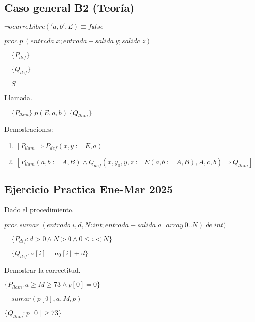 \documentclass[hidelinks]{article}
\begin{document}
\subsection{Caso general B2 (Teoría)}

$\neg ocurreLibre('a,b', E) \equiv false$ \par
$proc \; p \; (entrada \; x; entrada-salida \; y; salida \; z) $ \par
$\quad \{P_{def}\}$ \par
$\quad \{Q_{def}\}$ \par
$\quad S$ \par

Llamada.\par

$\quad \{P_{llam}\} \; p(E,a,b) \; \{Q_{llam}\}$ \par

Demostraciones:
\begin{enumerate}
	\item $[P_{llam} \Rightarrow P_{def}(x,y := E,a)]$ \par
	\item $[P_{llam}(a,b := A,B) \land Q_{def}(x,y_0,y,z := E(a,b := A,B),A,a,b) \Rightarrow Q_{llam}]$ \par
\end{enumerate}

\newpage


\subsection{Ejercicio Practica Ene-Mar 2025}

Dado el procedimiento. \par
$proc \; sumar \; (entrada \; i,d,N:int; entrada-salida \; a: \; array[0..N) \; de \; int) $ \par
$\quad \{P_{def}: d>0 \land N>0 \land 0 \leq i < N\}$ \par
$\quad \{Q_{def}: a[i] = a_0[i] + d\}$ \par

Demostrar la correctitud. \par

$\{P_{llam}: a \geq M \geq 73 \land p[0]=0\}$ \par
$\quad sumar(p[0],a,M,p)$ \par
$\{Q_{llam}: p[0] \geq 73\}$ \par

\vspace{2em}
\end{document}
